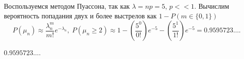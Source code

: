 \begin{solution}
Воспользуемся методом Пуассона, так как $\lambda = np = 5$, $p << 1$. Вычислим вероятность попадания двух и
более выстрелов как $1 - P(m \in \{0,1\})$
\[
  P(\mu_n) \approx \frac{\lambda^m_n}{m!}e^{-\lambda_n}, \; P(\mu_n \ge 2) \approx 1 - (\frac{5^0}{0!})e^{-5} - (\frac{5^1}{1!})e^{-5} = 0.9595723\ldots
.\] 
\end{solution}

\begin{result}
$0.9595723\ldots$.
\end{result}


